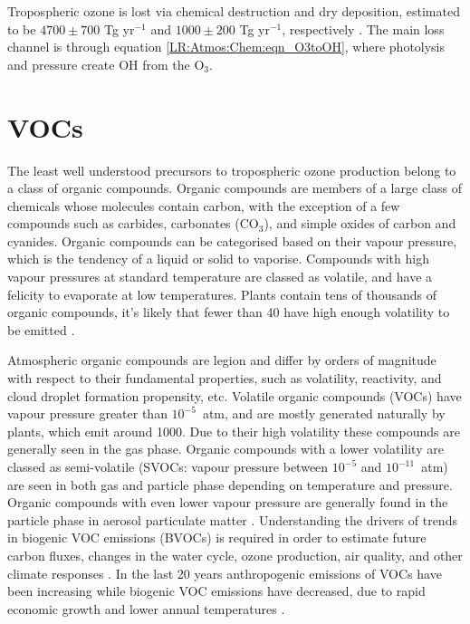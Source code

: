     
    Tropospheric ozone is lost via chemical destruction and dry deposition, estimated to be $4700\pm700$ Tg yr$^{-1}$ and $1000\pm200$ Tg yr$^{-1}$, respectively \citep{Stevenson2006,Young2018}.
    The main loss channel is through equation \ref{LR:Atmos:Chem:eqn_O3toOH}, where photolysis and pressure create OH from the O$_3$.
    

\section{VOCs}
\label{LR:VOCs}

  The least well understood precursors to tropospheric ozone production belong to a class of organic compounds.
  Organic compounds are members of a large class of chemicals whose molecules contain carbon, with the exception of a few compounds such as carbides, carbonates (CO$_3$), and simple oxides of carbon and cyanides.
  Organic compounds can be categorised based on their vapour pressure, which is the tendency of a liquid or solid to vaporise.
  Compounds with high vapour pressures at standard temperature are classed as volatile, and have a felicity to evaporate at low temperatures.
  Plants contain tens of thousands of organic compounds, it's likely that fewer than 40 have high enough volatility to be emitted \citep{Guenther2000}.
  
  Atmospheric organic compounds are legion and differ by orders of magnitude with respect to their fundamental properties, such as volatility, reactivity, and cloud droplet formation propensity, etc.
  Volatile organic compounds (VOCs) have vapour pressure greater than $10^{-5}$~atm, and are mostly generated naturally by plants, which emit around 1000\tgpyr \citep{Guenther1995, Glasius2016}.
  Due to their high volatility these compounds are generally seen in the gas phase.
  Organic compounds with a lower volatility are classed as semi-volatile (SVOCs: vapour pressure between $10^{-5}$ and $10^{-11}$~atm) are seen in both gas and particle phase depending on temperature and pressure.
  Organic compounds with even lower vapour pressure are generally found in the particle phase in aerosol particulate matter \citep{Glasius2016}.
  Understanding the drivers of trends in biogenic VOC emissions (BVOCs) is required in order to estimate future carbon fluxes, changes in the water cycle, ozone production, air quality, and other climate responses \citep{Yue2015}.
  In the last 20 years anthropogenic emissions of VOCs have been increasing while biogenic VOC emissions have decreased, due to rapid economic growth and lower annual temperatures \citep{Stavrakou2014, Kwon2017}.
  
